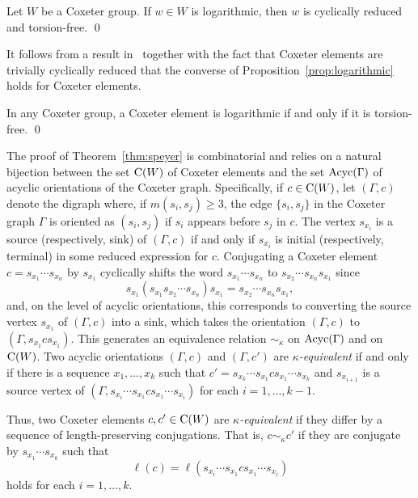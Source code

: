 \begin{proposition} \label{prop:logarithmic} Let $W$ be a Coxeter group. If $w\in W$ is logarithmic, then $w$ is cyclically reduced and torsion-free. \qed
\end{proposition}

    It follows from a result in~\cite{Speyer2009} together with the fact that Coxeter elements are trivially cyclically reduced that the converse of Proposition~\ref{prop:logarithmic} holds for Coxeter elements.

\begin{theorem}\label{thm:speyer} In any Coxeter group, a Coxeter element is logarithmic if and only if it is torsion-free. \qed
\end{theorem}

    The proof of Theorem~\ref{thm:speyer} is combinatorial and relies on a natural bijection between the set $\operatorname{\mathrm{C}}(W)$ of Coxeter elements and the set $\operatorname{Acyc}(\Gamma)$ of acyclic orientations of the Coxeter graph.
    Specifically, if $c \in \operatorname{\mathrm{C}}(W)$, let $(\Gamma,c)$ denote the digraph where, if $m(s_i,s_j) \geq 3$, the edge $\{s_i,s_j\}$ in the Coxeter graph $\Gamma$ is oriented as $(s_i,s_j)$ if $s_i$ appears before $s_j$ in $c$.
    The vertex $s_{x_i}$ is a source (respectively, sink) of $(\Gamma,c)$ if and only if $s_{x_i}$ is initial (respectively, terminal) in some reduced expression for $c$. 
    Conjugating a Coxeter element $c = s_{x_1} \cdots s_{x_n}$ by $s_{x_1}$ cyclically shifts the word $s_{x_1} \cdots s_{x_n}$ to $s_{x_2} \cdots s_{x_n}s_{x_1}$ since
\begin{equation} s_{x_1}(s_{x_1}s_{x_2}\cdots s_{x_n})s_{x_1} = s_{x_2} \cdots s_{x_n}s_{x_1},\end{equation}
    and, on the level of acyclic orientations, this corresponds to converting the source vertex $s_{x_1}$ of $(\Gamma,c)$ into a sink, which takes the orientation $(\Gamma,c)$ to $(\Gamma,s_{x_1}cs_{x_1})$.
    This generates an equivalence relation $\sim_\kappa$ on $\operatorname{Acyc}(\Gamma)$ and on $\operatorname{\mathrm{C}}(W)$.
    Two acyclic orientations $(\Gamma,c)$ and $(\Gamma,c')$ are \emph{$\kappa$-equivalent} if and only if there is a sequence $x_1,\dots,x_k$ such that $c' = s_{x_k}\cdots s_{x_1} c s_{x_1}\cdots s_{x_k}$ and $s_{x_{i+1}}$ is a source vertex of $(\Gamma,s_{x_i}\cdots s_{x_1}cs_{x_1}\cdots s_{x_i})$ for each $i=1,\dots,k-1$.
    
    Thus, two Coxeter elements $c,c' \in \operatorname{\mathrm{C}}(W)$ are \emph{$\kappa$-equivalent} if they differ by a sequence of length-preserving conjugations. That is, $c \sim_\kappa c'$ if they are conjugate by $s_{x_1}\cdots s_{x_k}$ such that
    $$\ell(c) = \ell(s_{x_i} \cdots s_{x_1} c s_{x_1} \cdots s_{x_i})$$ holds for each $i = 1,\ldots, k$.

